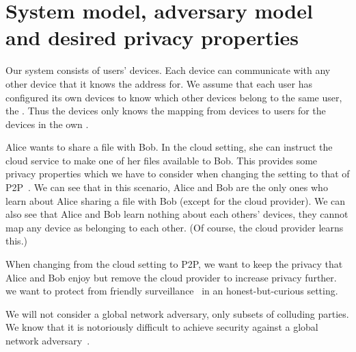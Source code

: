 \section{System model, adversary model and desired privacy properties}%
\label{system-model}

Our system consists of users' devices.
Each device can communicate with any other device that it knows the address for.
We assume that each user has configured its own devices to know which other 
devices belong to the same user, \ie the \squad.
Thus the devices only knows the mapping from devices to users for the devices in 
the own \squad.

Alice wants to share a file with Bob.
In the cloud setting, she can instruct the cloud service to make one of her 
files available to Bob.
This provides some privacy properties which we have to consider when changing 
the setting to that of \ac{P2P}~\cite{DevilInMetadata}.
We can see that in this scenario, Alice and Bob are the only ones who learn 
about Alice sharing a file with Bob (except for the cloud provider).
We can also see that Alice and Bob learn nothing about each others' devices, \ie 
they cannot map any device as belonging to each other.
(Of course, the cloud provider learns this.)

When changing from the cloud setting to \ac{P2P}, we want to keep the privacy 
that Alice and Bob enjoy but remove the cloud provider to increase privacy 
further.
\Ie we want to protect from friendly surveillance~\cite{FriendlySurveillance} in 
an honest-but-curious setting.

We will not consider a global network adversary, only subsets of colluding 
parties.
We know that it is notoriously difficult to achieve security against a global 
network adversary~\cite{SystemsForAnonymousCommunication}.
